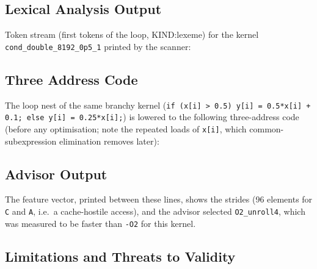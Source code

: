 \subsection{Lexical Analysis Output}

Token stream (first tokens of the loop, KIND:lexeme) for the kernel \texttt{cond\_double\_8192\_0p5\_1} printed by the scanner:



\subsection{Three Address Code}

The loop nest of the same branchy kernel
(\texttt{if (x[i] > 0.5) y[i] = 0.5*x[i] + 0.1; else y[i] = 0.25*x[i];}) is lowered to the following
three-address code (before any optimisation; note the repeated loads of \texttt{x[i]}, which
common-subexpression elimination removes later):



\subsection{Advisor Output}




The feature vector, printed between these lines, shows the strides (96 elements for \texttt{C} and
\texttt{A}, i.e.\ a cache-hostile access), and the advisor selected \texttt{O2\_unroll4}, which was measured to be
faster than \texttt{-O2} for this kernel.

\subsection{Limitations and Threats to Validity}
\label{sec:limits}

